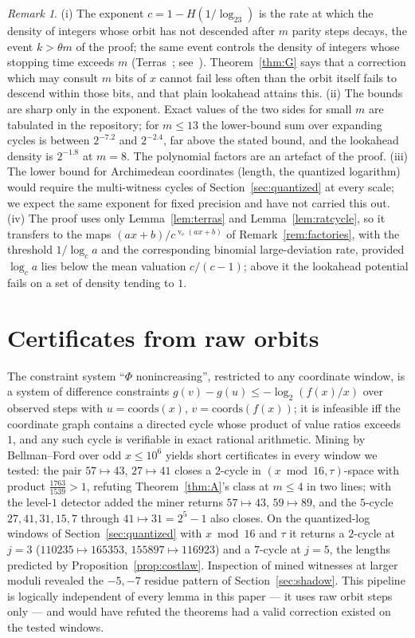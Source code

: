 \documentclass[11pt]{article}
\theoremstyle{definition}
\theoremstyle{remark}
\newtheorem{remark}[theorem]{Remark}
\DeclareMathOperator{\vv}{v}
\begin{document}
\begin{remark}\label{rem:density}
(i) The exponent $c=1-H(1/\log_23)$ is the rate at which the density of
integers whose orbit has not descended after $m$ parity steps decays, the
event $k>\theta m$ of the proof; the same event controls the density of
integers whose stopping time exceeds $m$ (Terras~\cite{Terras1976};
see~\cite{Lagarias1985}).
Theorem~\ref{thm:G} says that a correction which may consult $m$ bits of
$x$ cannot fail less often than the orbit itself fails to descend within
those bits, and that plain lookahead attains this.
(ii) The bounds are sharp only in the exponent. Exact values of the two
sides for small $m$ are tabulated in the repository; for $m\le13$ the
lower-bound sum over expanding cycles is between $2^{-7.2}$ and $2^{-2.4}$,
far above the stated bound, and the lookahead density is $2^{-1.8}$ at
$m=8$. The polynomial factors are an artefact of the proof.
(iii) The lower bound for Archimedean coordinates (length, the quantized
logarithm) would require the multi-witness cycles of
Section~\ref{sec:quantized} at every scale; we expect the same exponent
for fixed precision and have not carried this out.
(iv) The proof uses only Lemma~\ref{lem:terras} and
Lemma~\ref{lem:ratcycle}, so it transfers to the maps
$(ax+b)/c^{\vv_c(ax+b)}$ of Remark~\ref{rem:factories}, with the
threshold $1/\log_ca$ and the corresponding binomial large-deviation
rate, provided $\log_ca$ lies below the mean valuation $c/(c-1)$; above
it the lookahead potential fails on a set of density tending to $1$.
\end{remark}

\section{Certificates from raw orbits}\label{sec:certificates}

The constraint system ``$\Phi$ nonincreasing'', restricted to any
coordinate window, is a system of difference constraints
$g(v)-g(u)\le-\log_2(f(x)/x)$ over observed steps with
$u=\mathrm{coords}(x)$, $v=\mathrm{coords}(f(x))$; it is infeasible iff
the coordinate graph contains a directed cycle whose product of
value ratios exceeds $1$, and any such cycle is verifiable in exact
rational arithmetic. Mining by Bellman--Ford over odd $x\le10^{6}$
yields short certificates in every window we tested: the pair
$57\mapsto43$, $27\mapsto41$ closes a $2$-cycle in
$(x\bmod16,\tau)$-space with product $\tfrac{1763}{1539}>1$, refuting
Theorem~\ref{thm:A}'s class at $m\le4$ in two lines; with the level-$1$
detector added the miner returns $57\mapsto43$, $59\mapsto89$, and the
$5$-cycle $27,41,31,15,7$ through $41\mapsto31=2^{5}-1$ also closes.
On the quantized-log windows of Section~\ref{sec:quantized} with
$x\bmod16$ and $\tau$ it returns a $2$-cycle at $j=3$
($110235\mapsto165353$, $155897\mapsto116923$) and a $7$-cycle at
$j=5$, the lengths predicted by Proposition~\ref{prop:costlaw}.
Inspection of mined witnesses at larger moduli revealed the
$-5,-7$ residue pattern of Section~\ref{sec:shadow}. This pipeline is
logically independent of every lemma in this paper --- it uses raw
orbit steps only --- and would have refuted the theorems had a valid
correction existed on the tested windows.
\end{document}
